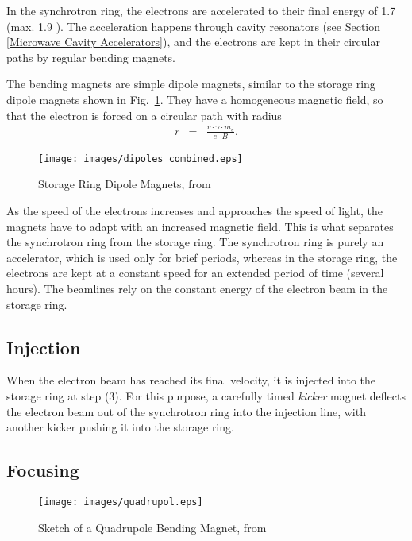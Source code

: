 \documentclass[a4paper,10pt]{article}
\begin{document}
    In the synchrotron ring, the electrons are accelerated to their final
energy of {1.7 \giga\electronvolt} (max. {1.9 \giga\electronvolt}). The
acceleration happens through cavity resonators (see Section 
\ref{Microwave Cavity Accelerators}), and the electrons are kept in their
circular paths by regular bending magnets. 

    The bending magnets are simple dipole magnets, similar to the storage ring
dipole magnets shown in Fig.~\ref{image:dipoles_combined}. They have a
homogeneous magnetic field, so that the electron is forced on a circular path
with radius
\begin{eqnarray}
  r &=& \frac{v \cdot \gamma \cdot  m_e}{e \cdot B}. \label{eq:bend_mag_radius}
\end{eqnarray}



\begin{figure}[htbp]
    \centering
\texttt{[image: images/dipoles\_combined.eps]}
    \caption{Storage Ring Dipole Magnets, from \citep{becker1995}}
  \label{image:dipoles_combined}
\end{figure}

    As the speed of the electrons increases and approaches the speed of light,
the magnets have to adapt with an increased magnetic field. This is what
separates the synchrotron ring from the storage ring. The synchrotron ring is
purely an accelerator, which is used only for brief periods, whereas in the
storage ring, the electrons are kept at a constant speed for an extended period
of time (several hours). The beamlines rely on the constant energy of the
electron beam in the storage ring.

    \subsection{Injection}
    When the electron beam has reached its final velocity, it is injected
into the storage ring at step (3). For this purpose, a carefully timed
\emph{kicker} magnet deflects the electron beam out of the synchrotron ring into
the injection line, with another kicker pushing it into the storage ring.

    \subsection{Focusing}

\begin{figure}[htbp]
    \centering
    \texttt{[image: images/quadrupol.eps]}
    \caption{Sketch of a Quadrupole Bending Magnet, from \citep{wille1991}}
  \label{image:quadrupol}
\end{figure}
\end{document}
